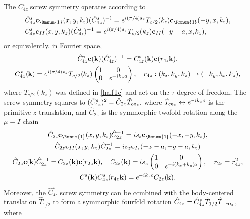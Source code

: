 The $C^s_{4z}$ screw symmetry operates according to \begin{align}
\begin{split}&\hat{C}^s_{4z}{\bf c}_{\Rmnum{1}}(x,y,k_z)(\hat{C}^s_{4z})^{-1}=e^{i(\pi/4)s_z}T_{c/2}(k_z){\bf c}_{\Rmnum{1}}(-y,x,k_z),\\&\hat{C}^s_{4z}{\bf c}_{II}(x,y,k_z)(\hat{C}^s_{4z})^{-1}=e^{i(\pi/4)s_z}T_{c/2}(k_z){\bf c}_{II}(-y-a,x,k_z),
\end{split}
\end{align} or equivalently, in Fourier space, \begin{gather}\hat{C}^s_{4z}{\bf c}({\bf k})(\hat{C}^s_{4z})^{-1}=C^s_{4z}({\bf k}){\bf c}(r_{4z}{\bf k}),\\C^s_{4z}({\bf k})=e^{i(\pi/4)s_z}T_{c/2}(k_z)\begin{pmatrix}1&0\\0&e^{-ik_ya}\end{pmatrix},\quad r_{4z}:(k_x,k_y,k_z)\to(-k_y,k_x,k_z),\nonumber\label{C4zssymm}\end{gather} where $T_{c/2}(k_z)$ was defined in \eqref{halfTc} and act on the $\tau$ degree of freedom. The screw symmetry squares to $(\hat{C}^s_{4z})^2=\hat{C}_{2z}\hat{T}_{c{\bf e}_z}$, where $\hat{T}_{c{\bf e}_z}\leftrightarrow e^{-ik_zc}$ is the primitive $z$ translation, and $\hat{C}_{2z}$ is the symmorphic twofold rotation along the $\mu=I$ chain \begin{gather}
\hat{C}_{2z}{\bf c}_{\Rmnum{1}}(x,y,k_z)\hat{C}_{2z}^{-1}=is_z{\bf c}_{\Rmnum{1}}(-x,-y,k_z),\\
\hat{C}_{2z}{\bf c}_{II}(x,y,k_z)\hat{C}_{2z}^{-1}=is_z{\bf c}_{II}(-x-a,-y-a,k_z)\nonumber\\
\hat{C}_{2z}{\bf c}({\bf k})\hat{C}_{2z}^{-1}=C_{2z}({\bf k}){\bf c}(r_{2z}{\bf k}),\quad C_{2z}({\bf k})=is_z
\begin{pmatrix}
1&0\\
0&e^{-i(k_x+k_y)a}
\end{pmatrix},\quad r_{2z}=r^2_{4z},\\C^s({\bf k})C^s_{4z}(r_{4z}{\bf k})=e^{-ik_zc}C_{2z}({\bf k}).\nonumber\end{gather} Moreover, the $\hat{C}^s_{4z}$ screw symmetry can be combined with the body-centered translation $\hat{T}_{1/2}$ to form a symmorphic fourfold rotation $\hat{C}_{4z}=\hat{C}^s_{4z}\hat{T}_{1/2}\hat{T}_{-c{\bf e}_z}$, where 
